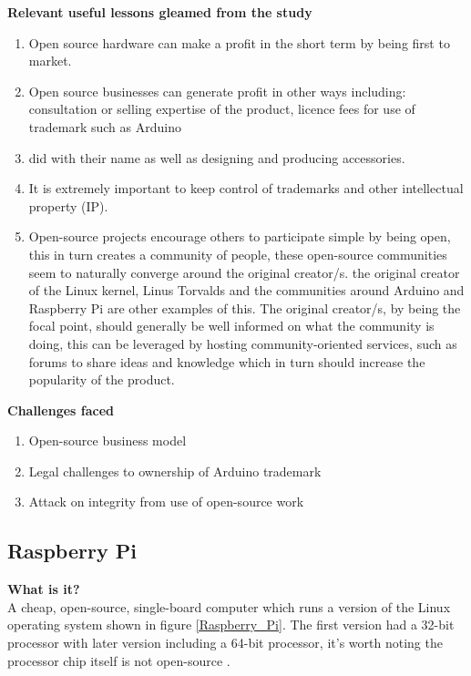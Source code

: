 \textbf{Relevant useful lessons gleamed from the study}
\begin{enumerate}
\item Open source hardware can make a profit in the short term by being first to market.
\item Open source businesses can generate profit in other ways including: consultation or selling expertise of the product, licence fees for use of trademark such as Arduino \item did with their name as well as designing and producing accessories.
\item It is extremely important to keep control of trademarks and other intellectual property (IP).
\item Open-source projects encourage others to participate simple by being open, this in turn creates a community of people, these open-source communities seem to naturally converge around the original creator/s. the original creator of the Linux kernel, Linus Torvalds and the communities around Arduino and Raspberry Pi are other examples of this. The original creator/s, by being the focal point, should generally be well informed on what the community is doing, this can be leveraged by hosting community-oriented services, such as forums to share ideas and knowledge which in turn should increase the popularity of the product. \\
\end{enumerate}

\textbf{Challenges faced}
\begin{enumerate}
\item Open-source business model
\item Legal challenges to ownership of Arduino trademark
\item Attack on integrity from use of open-source work
\end{enumerate}

\subsection{Raspberry Pi}
\textbf{What is it?}\\
A cheap, open-source, single-board computer which runs a version of the Linux operating system shown in figure \ref{Raspberry_Pi}. The first version had a 32-bit processor with later version including a 64-bit processor, it's worth noting the processor chip itself is not open-source
\cite{RN99}.\\

